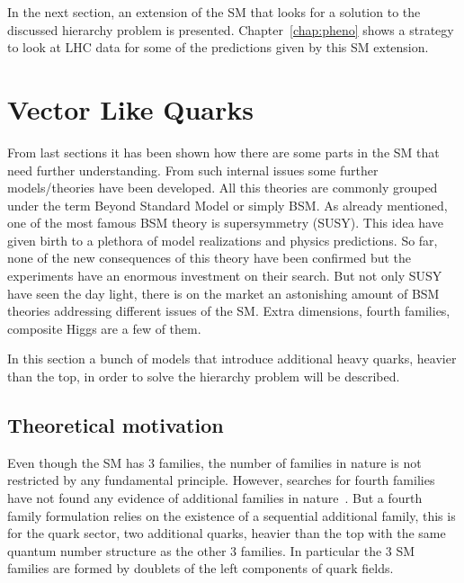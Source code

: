 In the next section, an extension of the SM that looks for a solution to the discussed hierarchy problem is presented. Chapter~\ref{chap:pheno} shows a strategy to look at LHC data for some of the predictions given by this SM extension.  %

\section{Vector Like Quarks}

\label{chap:VLQ}

From last sections it has been shown how there are some parts in the SM that need further understanding. From such internal issues some further models/theories have been developed. All this theories are commonly grouped under the term Beyond Standard Model or simply BSM. As already mentioned, one of the most famous BSM theory is supersymmetry (SUSY). This idea have given birth to a plethora of model realizations and physics predictions. So far, none of the new consequences of this theory have been confirmed but the experiments have an enormous investment on their search. But not only SUSY have seen the day light, there is on the market an astonishing amount of BSM theories addressing different issues of the SM. Extra dimensions, fourth families, composite Higgs are a few of them.

In this section a bunch of models that introduce additional heavy quarks, heavier than the top, in order to solve the hierarchy problem will be described. %

\subsection{Theoretical motivation}
\label{sec:motiv}

Even though the SM has 3 families, the number of families in nature is not restricted by any fundamental principle. However, searches for fourth families have not found any evidence of additional families in nature~\cite{Eberhardt:2012gv}. But a fourth family formulation relies on the existence of a sequential additional family, this is for the quark sector, two additional quarks, heavier than the top with the same quantum number structure as the other 3 families. In particular the 3 SM families are formed by doublets of the left components of quark fields. 

